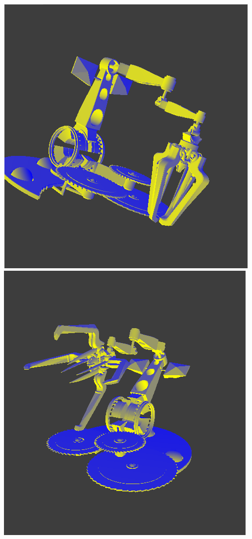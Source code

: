 \documentclass[letterpaper,11pt]{article}
\begin{document}
\includegraphics[scale = .6]{HW3_1_1.png}
\includegraphics[scale = .6]{HW3_1_2.png}
\end{document}
